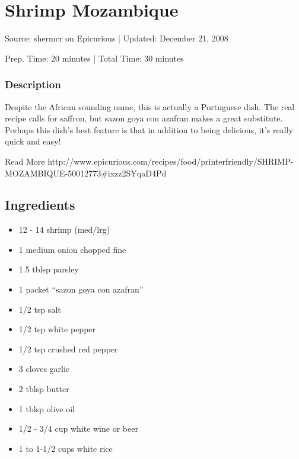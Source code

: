 \section{Shrimp Mozambique}

Source: shermcr on Epicurious | Updated: December 21, 2008

\begin{center}
Prep. Time: 20 minutes |
Total Time: 30 minutes
\end{center}

\subsubsection{Description}
Despite the African sounding name, this is actually a Portuguese dish. The real recipe calls for saffron, but sazon goya con azafran makes a great substitute. Perhaps this dish's best feature is that in addition to being delicious, it's really quick and easy!

Read More http://www.epicurious.com/recipes/food/printerfriendly/SHRIMP-MOZAMBIQUE-50012773\#ixzz2SYqaD4Pd

\subsection{Ingredients}
\begin{multicols}{2}
\begin{itemize}
    \item 12 - 14 shrimp (med/lrg)
    \item 1 medium onion chopped fine
    \item 1.5 tblsp parsley
    \item 1 packet ``sazon goya con azafran''
    \item 1/2 tsp salt
    \item 1/2 tsp white pepper
    \item 1/2 tsp crushed red pepper
    \item 3 cloves garlic
    \item 2 tblsp butter
    \item 1 tblsp olive oil
    \item 1/2 - 3/4 cup white wine or beer
    \item 1 to 1-1/2 cups white rice
\end{itemize}
\end{multicols}

